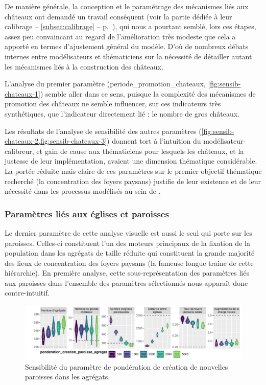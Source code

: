 De manière générale, la conception et le paramétrage des mécanismes liés aux châteaux ont demandé un travail conséquent (voir la partie dédiée à leur calibrage -- \cref{subsec:calibrage} -- p.~\pageref{subsubsec:calibrage-chateaux}), qui nous a pourtant semblé, lors ces étapes, assez peu convaincant au regard de l'amélioration très modeste que cela a apporté en termes d'ajustement général du modèle.
D'où de nombreux débats internes entre modélisateurs et thématiciens sur la nécessité de détailler autant les mécanismes liés à la construction des châteaux.

L'analyse du premier paramètre (\textsf{periode\_promotion\_chateaux}, \cref{fig:sensib-chateaux-1}) semble aller dans ce sens, puisque la complexité des mécanismes de promotion des châteaux ne semble influencer, sur ces indicateurs très synthétiques, que l'indicateur directement lié : le nombre de gros châteaux.

Les résultats de l'analyse de sensibilité des autres paramètres (\cref{fig:sensib-chateaux-2,fig:sensib-chateaux-3}) donnent tort à l'intuition du modélisateur-\og calibreur\fg{}, et gain de cause aux thématiciens pour lesquels les châteaux, et la justesse de leur implémentation, avaient une dimension thématique considérable.
La portée réduite mais claire de ces paramètres sur le premier objectif thématique recherché (la concentration des foyers paysans) justifie de leur existence et de leur nécessité dans les processus modélisés au sein de \simfeodal{}.

\subsubsection{Paramètres liés aux églises et paroisses\label{sssec:sensib-params-eglises}}

Le dernier paramètre de cette analyse visuelle est aussi le seul qui porte sur les paroisses.
Celles-ci constituent l'un des moteurs principaux de la fixation de la population dans les agrégats de taille réduite qui constituent la grande majorité des lieux de concentration des foyers paysans (la fameuse \og longue traîne\fg{} de cette hiérarchie).
En première analyse, cette sous-représentation des paramètres liés aux paroisses dans l'ensemble des paramètres sélectionnés nous apparaît donc contre-intuitif.

\begin{figure}[H]
	\centering
	\includegraphics[width=\linewidth]{img/sensib/sensibilite_ponderation_creation_paroisse_agregat.pdf}
	\caption{Sensibilité du paramètre de pondération de création de nouvelles paroisses dans les agrégats.}
	\label{fig:sensib-paroisses}
\end{figure}

